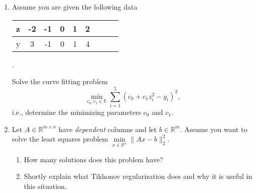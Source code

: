 \vspace*{-0.5cm}
\begin{enumerate}
	\item Assume you are given the following data
	\begin{center}
		\begin{tabular}{|l|c|c|c|c|c|c||c|c|}\hline
			z&-2&-1&0&1&2\\ 
			\hline
			y&3&-1&0&1&4\\
			\hline
		\end{tabular}.
	\end{center}
	Solve the curve fitting problem
	$$
	\min\limits_{c_0, c_1 \in \mathbb{R}} \sum_{i=1}^5 (c_0 + c_1z_i^2 - y_i)^2,
	$$
	i.e., determine the minimizing parameters $c_0$ and $c_1$.
\item Let  $A \in \mathbb{R}^{m \times n}$ have \textit{dependent} columns and let $b \in \mathbb{R}^{m}$. Assume you want to solve the least squares problem $\min\limits_{x \in \mathbb{R}^n } \| Ax - b \|_2^2$.
\begin{enumerate}
	\item How many solutions does this problem have?
	\item Shortly explain what Tikhonov regularization does and why it is useful in this situation.
\end{enumerate}
\end{enumerate}
 
